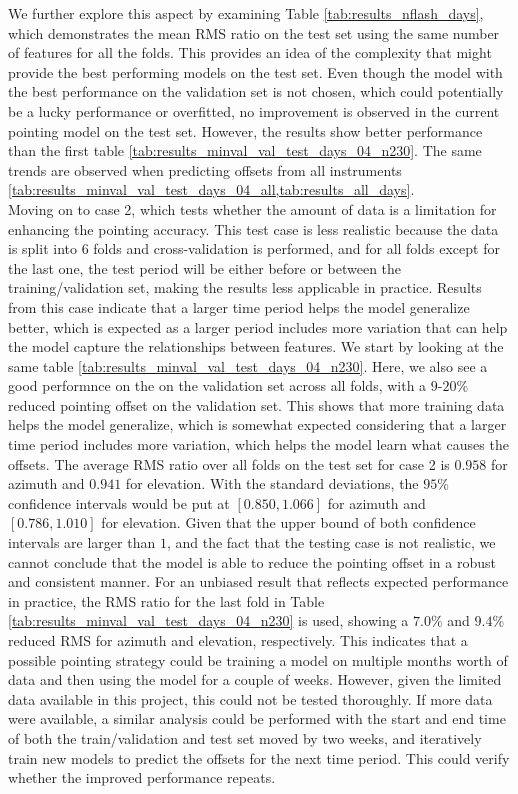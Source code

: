 We further explore this aspect by examining Table \ref{tab:results_nflash_days}, which demonstrates the mean RMS ratio on the test set using the same number of features for all the folds.
This provides an idea of the complexity that might provide the best performing models on the test set.
Even though the model with the best performance on the validation set is not chosen, which could potentially be a lucky performance or overfitted,
no improvement is observed in the current pointing model on the test set.
However, the results show better performance than the first table \ref{tab:results_minval_val_test_days_04_n230}.
The same trends are observed when predicting offsets from all instruments \ref{tab:results_minval_val_test_days_04_all,tab:results_all_days}. \\

Moving on to case 2, which tests whether the amount of data is a limitation for enhancing the pointing accuracy.
This test case is less realistic because the data is split into $6$ folds and cross-validation is performed,
and for all folds except for the last one, the test period will be either before or between the training/validation set, making the results less applicable in practice.
Results from this case indicate that a larger time period helps the model generalize better, which is expected as a larger period includes more variation that can help the model capture the relationships between features.
We start by looking at the same table \ref{tab:results_minval_val_test_days_04_n230}.
Here, we also see a good performnce on the on the validation set across all folds, with a $9$-$20\%$ reduced pointing offset on the validation set.
This shows that more training data helps the model generalize, which is somewhat expected considering that a larger time period includes more variation,
which helps the model learn what causes the offsets.
The average RMS ratio over all folds on the test set for case 2 is $0.958$ for azimuth and $0.941$ for elevation.
With the standard deviations, the $95\%$ confidence intervals would be put at $[0.850, 1.066]$ for azimuth and $[0.786, 1.010]$ for elevation.
Given that the upper bound of both confidence intervals are larger than $1$, and the fact that the testing case is not realistic,
we cannot conclude that the model is able to reduce the pointing offset in a robust and consistent manner.
For an unbiased result that reflects expected performance in practice, the RMS ratio for the last fold in Table \ref{tab:results_minval_val_test_days_04_n230} is used,
showing a $7.0\%$ and $9.4\%$ reduced RMS for azimuth and elevation, respectively.
This indicates that a possible pointing strategy could be training a model on multiple months worth of data and then using the model for a couple of weeks.
However, given the limited data available in this project, this could not be tested thoroughly.
If more data were available, a similar analysis could be performed with the start and end time of both the train/validation and test set moved by two weeks,
and iteratively train new models to predict the offsets for the next time period.
This could verify whether the improved performance repeats.\\

